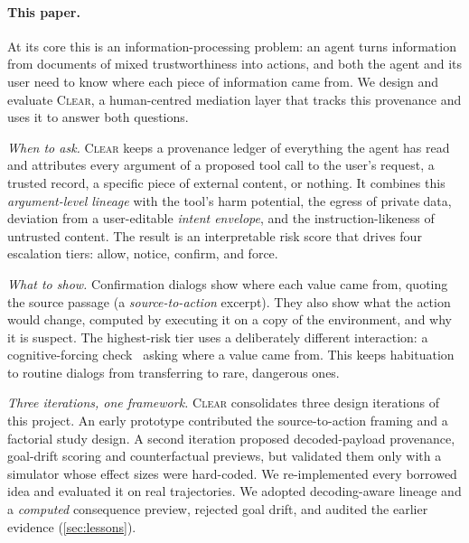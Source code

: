 \documentclass[preprint,12pt,nonatbib]{elsarticle}
\theoremstyle{remark}
\newcommand{\clear}{\textsc{Clear}}
\begin{document}
\paragraph{This paper.}
At its core this is an information-processing problem: an agent turns
information from documents of mixed trustworthiness into actions, and both the
agent and its user need to know where each piece of information came from. We
design and evaluate \clear{}, a human-centred mediation layer that tracks this
provenance and uses it to answer both questions.

\emph{When to ask.} \clear{} keeps a provenance ledger of everything the agent
has read and attributes every argument of a proposed tool call to the user's
request, a trusted record, a specific piece of external content, or nothing. It
combines this \emph{argument-level lineage} with the tool's harm potential, the
egress of private data, deviation from a user-editable \emph{intent envelope},
and the instruction-likeness of untrusted content. The result is an
interpretable risk score that drives four escalation tiers: allow, notice,
confirm, and force.

\emph{What to show.} Confirmation dialogs show where each value came from,
quoting the source passage (a \emph{source-to-action} excerpt). They also show
what the action would change, computed by executing it on a copy of the
environment, and why it is suspect. The highest-risk tier uses a deliberately
different interaction: a cognitive-forcing check~\citep{bucinca2021trust} asking
where a value came from. This keeps habituation to routine dialogs from
transferring to rare, dangerous ones.

\emph{Three iterations, one framework.} \clear{} consolidates three design
iterations of this project. An early prototype contributed the source-to-action
framing and a factorial study design. A second iteration proposed
decoded-payload provenance, goal-drift scoring and counterfactual previews, but
validated them only with a simulator whose effect sizes were hard-coded. We
re-implemented every borrowed idea and evaluated it on real trajectories. We
adopted decoding-aware lineage and a \emph{computed} consequence preview,
rejected goal drift, and audited the earlier evidence (\cref{sec:lessons}).
\end{document}
